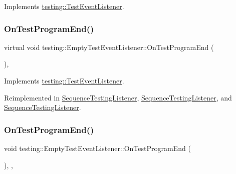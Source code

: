 Implements \mbox{\hyperlink{classtesting_1_1_test_event_listener_a054f8705c883fa120b91473aff38f2ee}{testing\+::\+Test\+Event\+Listener}}.

\mbox{\label{classtesting_1_1_empty_test_event_listener_a0abcc02bd2331a2e29ad6f4d9daf2a32}} 
\subsubsection{\texorpdfstring{OnTestProgramEnd()}{OnTestProgramEnd()}\hspace{0.1cm}{\footnotesize\ttfamily [1/3]}}
{\footnotesize\ttfamily virtual void testing\+::\+Empty\+Test\+Event\+Listener\+::\+On\+Test\+Program\+End (\begin{DoxyParamCaption}\item[{const \mbox{\hyperlink{classtesting_1_1_unit_test}{Unit\+Test}} \&}]{ }\end{DoxyParamCaption})\hspace{0.3cm}{\ttfamily [inline]}, {\ttfamily [virtual]}}



Implements \mbox{\hyperlink{classtesting_1_1_test_event_listener_ad15b6246d94c268e233487a86463ef3d}{testing\+::\+Test\+Event\+Listener}}.



Reimplemented in \mbox{\hyperlink{class_sequence_testing_listener_aacac5e15bac089460841ff63a5c31f57}{Sequence\+Testing\+Listener}}, \mbox{\hyperlink{class_sequence_testing_listener_a506077b57a6789daf900e61285a58d8a}{Sequence\+Testing\+Listener}}, and \mbox{\hyperlink{class_sequence_testing_listener_a506077b57a6789daf900e61285a58d8a}{Sequence\+Testing\+Listener}}.

\mbox{\label{classtesting_1_1_empty_test_event_listener_aaa9d683e8e0c850af67a0b92d785ddb9}} 
\subsubsection{\texorpdfstring{OnTestProgramEnd()}{OnTestProgramEnd()}\hspace{0.1cm}{\footnotesize\ttfamily [2/3]}}
{\footnotesize\ttfamily void testing\+::\+Empty\+Test\+Event\+Listener\+::\+On\+Test\+Program\+End (\begin{DoxyParamCaption}\item[{const \mbox{\hyperlink{classtesting_1_1_unit_test}{Unit\+Test}} \&}]{ }\end{DoxyParamCaption})\hspace{0.3cm}{\ttfamily [inline]}, {\ttfamily [override]}, {\ttfamily [virtual]}}



